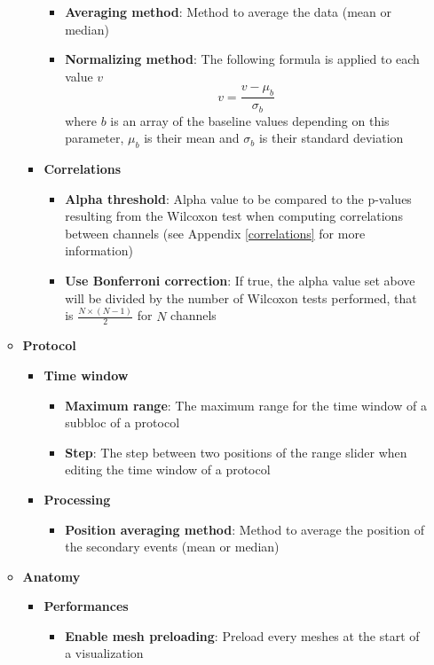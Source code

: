 \documentclass[a4paper]{article}
\begin{document}
\begin{itemize}
\begin{itemize}
\begin{itemize}
\begin{itemize}
\item \textbf{Averaging method}: Method to average the data (mean or median)
\item \textbf{Normalizing method}: The following formula is applied to each value $v$ $$v = \frac{v - \mu_{b}}{\sigma_{b}}$$ where $b$ is an array of the baseline values depending on this parameter, $\mu_b$ is their mean and $\sigma_b$ is their standard deviation
\end{itemize}
\item \textbf{Correlations}
\begin{itemize}
\item \textbf{Alpha threshold}: Alpha value to be compared to the p-values resulting from the Wilcoxon test when computing correlations between channels (see Appendix \ref{correlations} for more information)
\item \textbf{Use Bonferroni correction}: If true, the alpha value set above will be divided by the number of Wilcoxon tests performed, that is $\frac{N \times (N - 1)}{2}$ for $N$ channels
\end{itemize}
\end{itemize}
\item \textbf{Protocol}
\begin{itemize}
\item \textbf{Time window}
\begin{itemize}
\item \textbf{Maximum range}: The maximum range for the time window of a subbloc of a protocol
\item \textbf{Step}: The step between two positions of the range slider when editing the time window of a protocol
\end{itemize}
\end{itemize}
\begin{itemize}
\item \textbf{Processing}
\begin{itemize}
\item \textbf{Position averaging method}: Method to average the position of the secondary events (mean or median)
\end{itemize}
\end{itemize}
\item \textbf{Anatomy}
\begin{itemize}
\item \textbf{Performances}
\begin{itemize}
\item \textbf{Enable mesh preloading}: Preload every meshes at the start of a visualization

\end{itemize}
\end{itemize}
\end{itemize}
\end{itemize}
\end{document}
